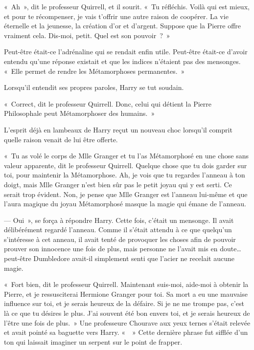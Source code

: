 «~Ah~», dit le professeur Quirrell, et il sourit.
«~Tu réfléchis.
Voilà qui est mieux, et pour te récompenser, je vais t'offrir une autre raison de coopérer.
La vie éternelle et la jeunesse, la création d'or et d'argent.
Suppose que la Pierre offre vraiment cela.
Dis-moi, petit.
Quel est son pouvoir~?~»

Peut-être était-ce l'adrénaline qui se rendait enfin utile.
Peut-être était-ce d'avoir entendu qu'une réponse existait et que les indices n'étaient pas des mensonges.
«~Elle permet de rendre les Métamorphoses permanentes.~»

Lorsqu'il entendit ses propres paroles, Harry se tut soudain.

«~Correct, dit le professeur Quirrell.
Donc, celui qui détient la Pierre Philosophale peut Métamorphoser des humains.~»

L'esprit déjà en lambeaux de Harry reçut un nouveau choc lorsqu'il comprit quelle raison venait de lui être offerte.

«~Tu as volé le corps de Mlle Granger et tu l'as Métamorphosé en une chose sans valeur apparente, dit le professeur Quirrell.
Quelque chose que tu dois garder sur toi, pour maintenir la Métamorphose.
Ah, je vois que tu regardes l'anneau à ton doigt, mais Mlle Granger n'est bien sûr pas le petit joyau qui y est serti.
Ce serait trop évident.
Non, je pense que Mlle Granger est l'anneau lui-même et que l'aura magique du joyau Métamorphosé masque la magie qui émane de l'anneau.

--- Oui~», se força à répondre Harry.
Cette fois, c'était un mensonge.
Il avait délibérément regardé l'anneau.
Comme il s'était attendu à ce que quelqu'un s'intéresse à cet anneau, il avait tenté de provoquer les choses afin de pouvoir prouver son innocence une fois de plus, mais personne ne l'avait mis en doute… peut-être Dumbledore avait-il simplement senti que l'acier ne recelait aucune magie.

«~Fort bien, dit le professeur Quirrell.
Maintenant suis-moi, aide-moi à obtenir la Pierre, et je ressusciterai Hermione Granger pour toi.
Sa mort a eu une mauvaise influence sur toi, et je serais heureux de la défaire.
Si je ne me trompe pas, c'est là ce que tu désires le plus.
J'ai souvent été bon envers toi, et je serais heureux de l'être une fois de plus.~»
Une professeure Chourave aux yeux ternes s'était relevée et avait pointé sa baguette vers Harry.
«~~» Cette dernière phrase fut sifflée d'un ton qui laissait imaginer un serpent sur le point de frapper.

